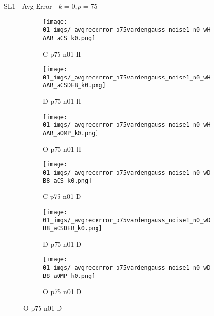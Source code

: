 \begin{frame}{SL1 - Avg Error - $k=0,p=75$}{}
\begin{figure}
\begin{subfigure}{0.13\textwidth}
\texttt{[image: 01\_imgs/\_avgrecerror\_p75vardengauss\_noise1\_n0\_wHAAR\_aCS\_k0.png]}
\caption*{\tiny C p75 n01 H}
\end{subfigure}
\begin{subfigure}{0.13\textwidth}
\texttt{[image: 01\_imgs/\_avgrecerror\_p75vardengauss\_noise1\_n0\_wHAAR\_aCSDEB\_k0.png]}
\caption*{\tiny D p75 n01 H}
\end{subfigure}
\begin{subfigure}{0.13\textwidth}
\texttt{[image: 01\_imgs/\_avgrecerror\_p75vardengauss\_noise1\_n0\_wHAAR\_aOMP\_k0.png]}
\caption*{\tiny O p75 n01 H}
\end{subfigure}
\begin{subfigure}{0.13\textwidth}
\texttt{[image: 01\_imgs/\_avgrecerror\_p75vardengauss\_noise1\_n0\_wDB8\_aCS\_k0.png]}
\caption*{\tiny C p75 n01 D}
\end{subfigure}
\begin{subfigure}{0.13\textwidth}
\texttt{[image: 01\_imgs/\_avgrecerror\_p75vardengauss\_noise1\_n0\_wDB8\_aCSDEB\_k0.png]}
\caption*{\tiny D p75 n01 D}
\end{subfigure}
\begin{subfigure}{0.13\textwidth}
\texttt{[image: 01\_imgs/\_avgrecerror\_p75vardengauss\_noise1\_n0\_wDB8\_aOMP\_k0.png]}
\caption*{\tiny O p75 n01 D}
\end{subfigure}

\vspace{5pt}


\end{figure}
\end{frame}

